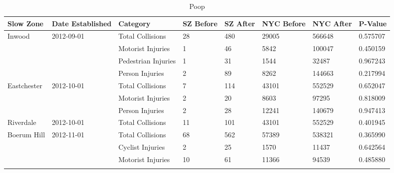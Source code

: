 \documentclass[10pt,journal,compsoc]{IEEEtran}
\begin{document}
\begin{table}[]
\centering
\caption{Poop }
\label{tab:sz}
\begin{tabular}{|l|l|l|l|l|l|l|l|}
\hline
Slow Zone                                      & Date Established            & Category            & SZ Before & SZ After & NYC Before & NYC After & P-Value  \\ \hline
\multirow{4}{*}{Inwood}                        & \multirow{4}{*}{2012-09-01} & Total Collisions    & 28        & 480      & 29005      & 566648    & 0.575707 \\ \cline{3-8} 
                                               &                             & Motorist Injuries   & 1         & 46       & 5842       & 100047    & 0.450159 \\ \cline{3-8} 
                                               &                             & Pedestrian Injuries & 1         & 31       & 1544       & 32487     & 0.967243 \\ \cline{3-8} 
                                               &                             & Person Injuries     & 2         & 89       & 8262       & 144663    & 0.217994 \\ \hline
\multirow{3}{*}{Eastchester}                   & \multirow{3}{*}{2012-10-01} & Total Collisions    & 7         & 114      & 43101      & 552529    & 0.652047 \\ \cline{3-8} 
                                               &                             & Motorist Injuries   & 2         & 20       & 8603       & 97295     & 0.818009 \\ \cline{3-8} 
                                               &                             & Person Injuries     & 2         & 28       & 12241      & 140679    & 0.947413 \\ \hline
Riverdale                                      & 2012-10-01                  & Total Collisions    & 11        & 101      & 43101      & 552529    & 0.401945 \\ \hline
\multirow{5}{*}{Boerum Hill}                   & \multirow{5}{*}{2012-11-01} & Total Collisions    & 68        & 562      & 57389      & 538321    & 0.365990 \\ \cline{3-8} 
                                               &                             & Cyclist Injuries    & 2         & 25       & 1570       & 11437     & 0.642564 \\ \cline{3-8} 
                                               &                             & Motorist Injuries   & 10        & 61       & 11366      & 94539     & 0.485880 \\ \cline{3-8} 

\end{tabular}
\end{table}
\end{document}
